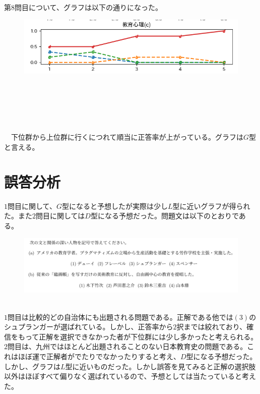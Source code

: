 \documentclass[12pt]{jarticle}
\begin{document}
第$8$問目について、グラフは以下の通りになった。
\vspace{0.5cm}
\begin{figure}[H]
  \includegraphics[bb = -7 60 1 1,scale = 1.5]{Figure_8.png}
\end{figure}
\leavevmode \\
\\
\\
\\
\\
\ \ 下位群から上位群に行くにつれて順当に正答率が上がっている。グラフは$G$型と言える。
\section{誤答分析}
$1$問目に関して、$G$型になると予想したが実際は少し$L$型に近いグラフが得られた。また$2$問目に関しては$D$型になる予想だった。問題文は以下のとおりである。\\
\hrulefill
\vspace{3cm}
\begin{figure}[H]
  \includegraphics[bb = -7 60 1 1,scale = 0.4]{ques_1.png}
\end{figure}
\hrulefill\\
$1$問目は比較的どの自治体にも出題される問題である。正解である他では$(3)$のシュプランガーが選ばれている。しかし、正答率から$2$択までは絞れており、確信をもって正解を選択できなかった者が下位群には少し多かったと考えられる。$2$問目は、九州ではほとんど出題されることのない日本教育史の問題である。これはほぼ運で正解者がでたりでなかったりすると考え、$D$型になる予想だった。しかし、グラフは$L$型に近いものだった。しかし誤答を見てみると正解の選択肢以外はほぼすべて偏りなく選ばれているので、予想としては当たっていると考えた。
\end{document}
